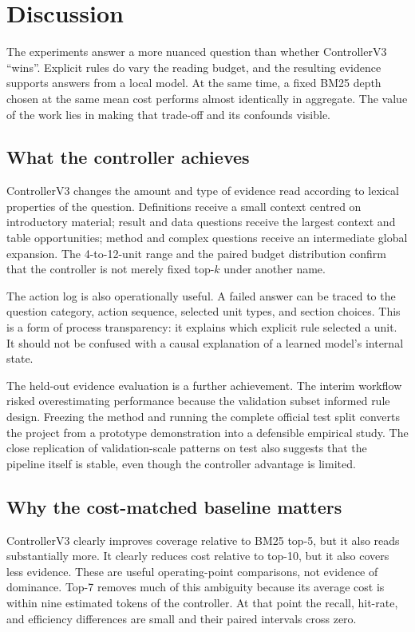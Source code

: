 \chapter{Discussion}
\label{chap:discussion}

The experiments answer a more nuanced question than whether ControllerV3 ``wins''. Explicit rules do vary the reading budget, and the resulting evidence supports answers from a local model. At the same time, a fixed BM25 depth chosen at the same mean cost performs almost identically in aggregate. The value of the work lies in making that trade-off and its confounds visible.

\section{What the controller achieves}

ControllerV3 changes the amount and type of evidence read according to lexical properties of the question. Definitions receive a small context centred on introductory material; result and data questions receive the largest context and table opportunities; method and complex questions receive an intermediate global expansion. The 4-to-12-unit range and the paired budget distribution confirm that the controller is not merely fixed top-$k$ under another name.

The action log is also operationally useful. A failed answer can be traced to the question category, action sequence, selected unit types, and section choices. This is a form of process transparency: it explains which explicit rule selected a unit. It should not be confused with a causal explanation of a learned model's internal state.

The held-out evidence evaluation is a further achievement. The interim workflow risked overestimating performance because the validation subset informed rule design. Freezing the method and running the complete official test split converts the project from a prototype demonstration into a defensible empirical study. The close replication of validation-scale patterns on test also suggests that the pipeline itself is stable, even though the controller advantage is limited.

\section{Why the cost-matched baseline matters}

ControllerV3 clearly improves coverage relative to BM25 top-5, but it also reads substantially more. It clearly reduces cost relative to top-10, but it also covers less evidence. These are useful operating-point comparisons, not evidence of dominance. Top-7 removes much of this ambiguity because its average cost is within nine estimated tokens of the controller. At that point the recall, hit-rate, and efficiency differences are small and their paired intervals cross zero.


